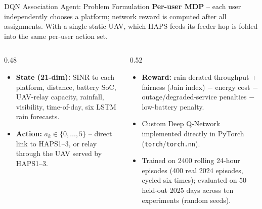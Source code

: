 \documentclass[aspectratio=169]{beamer}
\begin{document}
\begin{frame}{DQN Association Agent: Problem Formulation}
\footnotesize
\textbf{Per-user MDP} -- each user independently chooses a platform; network
reward is computed after all assignments. With a single static UAV, which
HAPS feeds its feeder hop is folded into the same per-user action set.
\vspace{2mm}

\begin{columns}[T]
\begin{column}{0.48\textwidth}
\begin{itemize}\setlength{\itemsep}{3pt}
  \item \textbf{State (21-dim):} SINR to each platform, distance,
        battery SoC, UAV-relay capacity, rainfall, visibility,
        time-of-day, six LSTM rain forecasts.
  \item \textbf{Action:} $a_k \in \{0,\dots,5\}$ -- direct link to
        HAPS1--3, or relay through the UAV served by HAPS1--3.
\end{itemize}
\end{column}
\begin{column}{0.52\textwidth}
\begin{itemize}\setlength{\itemsep}{3pt}
  \item \textbf{Reward:} rain-derated throughput + fairness (Jain
        index) $-$ energy cost $-$ outage/degraded-service penalties
        $-$ low-battery penalty.
\end{itemize}
\vspace{2mm}
\begin{itemize}\setlength{\itemsep}{3pt}
  \item Custom Deep Q-Network implemented directly in PyTorch
        (\texttt{torch}/\texttt{torch.nn}).
  \item Trained on 2400 rolling 24-hour episodes (400 real 2024
        episodes, cycled six times); evaluated on 50 held-out 2025
        days across ten experiments (random seeds).
\end{itemize}
\end{column}
\end{columns}
\end{frame}
\end{document}
